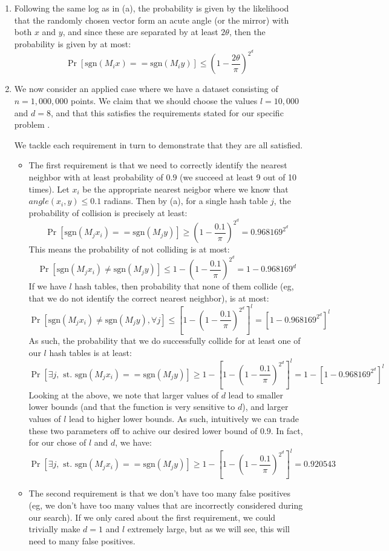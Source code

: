 \documentclass[12pt]{article}
\begin{document}
\begin{enumerate}[label=(\alph*)]
  \item
    Following the same log as in (a), the probability is given by the likelihood that the randomly chosen vector form an acute angle (or the mirror) with both $x$ and $y$, and since these are separated by at least $2\theta$, then the probability is given by at most:
    \[
       \Pr[\text{sgn}(M_ix) == \text{sgn}(M_iy)] \leq \left(1 - \frac{2\theta}{\pi} \right)^{2^d}
    \]

  \item
    We now consider an applied case where we have a dataset consisting of $n = 1,000,000$ points. We claim that we should choose the values $l = 10,000$ and $d = 8$, and that this satisfies the requirements stated for our specific problem .

    We tackle each requirement in turn to demonstrate that they are all satisfied.

    \begin{itemize}
      \item The first requirement is that we need to correctly identify the nearest neighbor with at least probability of $0.9$ (we succeed at least 9 out of 10 times). Let $x_i$ be the appropriate nearest neigbor where we know that $angle(x_i, y) \leq 0.1$ radians. Then by (a), for a single hash table $j$, the probability of collision is precisely at least:
      \[
        \Pr[\text{sgn}(M_jx_i) == \text{sgn}(M_jy)] \geq \left(1 -\frac{0.1}{\pi}\right)^{2^d} = 0.968169^{2^d}
      \]
      This means the probability of not colliding is at most:
      \[
        \Pr[\text{sgn}(M_jx_i) \neq \text{sgn}(M_jy)] \leq 1 - \left(1 -\frac{0.1}{\pi}\right)^{2^d} = 1 - 0.968169^d
      \]
      If we have $l$ hash tables, then probability that none of them collide (eg, that we do not identify the correct nearest neighbor), is at most:
      \[
          \Pr[\text{sgn}(M_jx_i) \neq \text{sgn}(M_jy), \forall j] \leq \left[1 - \left(1 -\frac{0.1}{\pi}\right)^{2^d}\right]^l = \left[1 - 0.968169^{2^d}\right]^l
      \]
      As such, the probability that we do successfully collide for at least one of our $l$ hash tables is at least:
      \[
        \Pr[\exists j, \text{ st. } \text{sgn}(M_jx_i) == \text{sgn}(M_jy)] \geq 1 -  \left[1 - \left(1 -\frac{0.1}{\pi}\right)^{2^d}\right]^l = 1 -\left[1 - 0.968169^{2^d}\right]^l
      \]
      Looking at the above, we note that larger values of $d$ lead to smaller lower bounds (and that the function is very sensitive to $d$), and larger values of $l$ lead to higher lower bounds. As such, intuitively we can trade these two parameters off to achive our desired lower bound of $0.9$. In fact, for our chose of $l$ and $d$, we have:
      \[
        \Pr[\exists j, \text{ st. } \text{sgn}(M_jx_i) == \text{sgn}(M_jy)] \geq 1 -  \left[1 - \left(1 -\frac{0.1}{\pi}\right)^{2^d}\right]^l = 0.920543
      \]
    \item
      The second requirement is that we don't have too many false positives (eg, we don't have too many values that are incorrectly considered during our search). If we only cared about the first requirement, we could trivially make $d = 1$ and $l$ extremely large, but as we will see, this will need to many false positives.


\end{itemize}
\end{enumerate}
\end{document}
